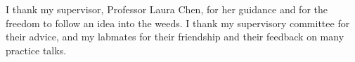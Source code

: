 I thank my supervisor, Professor Laura Chen, for her guidance and for the freedom to follow
an idea into the weeds. I thank my supervisory committee for their advice, and my labmates for
their friendship and their feedback on many practice talks.

